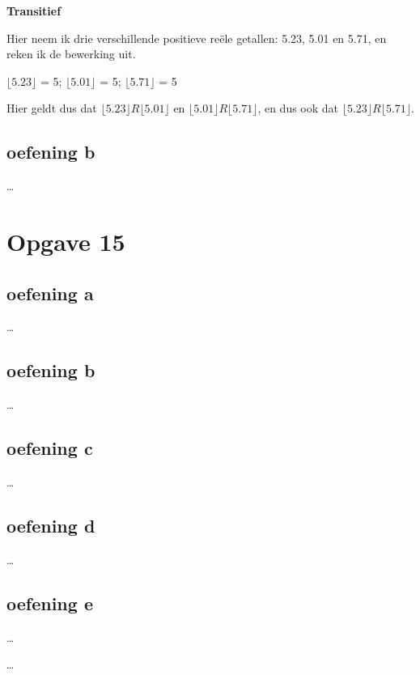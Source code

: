 \documentclass[11pt, a4paper]{article}
\begin{document}
\textbf{Transitief}

Hier neem ik drie verschillende positieve reële getallen: 5.23, 5.01 en 5.71, en reken ik de bewerking uit.

$\lfloor 5.23 \rfloor$ = 5; $\lfloor 5.01 \rfloor$ = 5; $\lfloor 5.71 \rfloor$ = 5

Hier geldt dus dat $\lfloor 5.23 \rfloor R \lfloor 5.01 \rfloor$ en $\lfloor 5.01 \rfloor R \lfloor 5.71 \rfloor$, en dus ook dat $\lfloor 5.23 \rfloor R \lfloor 5.71 \rfloor$.

\subsection*{oefening b}
\ldots


\section*{Opgave 15}
\subsection*{oefening a}
\ldots


\subsection*{oefening b}
\ldots


\subsection*{oefening c}
\ldots


\subsection*{oefening d}
\ldots


\subsection*{oefening e}
\ldots







\ldots
\end{document}
